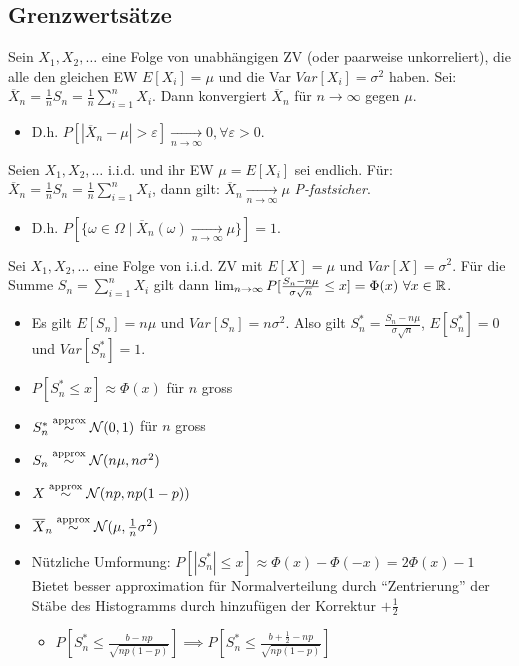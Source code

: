 \subsection{Grenzwertsätze}
\begin{itemize}
     Sein $X_1, X_2, \dots$ eine Folge von unabhängigen ZV (oder paarweise unkorreliert), die alle den gleichen EW $E[X_i] = \mu$ und die Var $Var[X_i] = \sigma^2$ haben. Sei: $\overline{X}_n = \frac{1}{n} S_n = \frac{1}{n} \sum_{i=1}^{n} X_i$. Dann konvergiert $\overline{X}_n$ für $n \to \infty$ gegen $\mu$.
        \begin{itemize}
            \item  D.h. $P[|\overline{X}_n - \mu| > \varepsilon] \underset{n \to \infty}{\to} 0, \forall \varepsilon > 0$.
        \end{itemize}
     Seien $X_1, X_2, \dots$ i.i.d. und ihr EW $\mu = E[X_i]$ sei endlich. Für: $\overline{X}_n = \frac{1}{n} S_n = \frac{1}{n} \sum_{i=1}^{n} X_i$, dann gilt: $\overline{X}_n \underset{n \to \infty}{\to} \mu$ \textit{P-fastsicher}.
        \begin{itemize}
            \item D.h. $P[\{\omega \in \Omega \mid \overline{X}_n(\omega) \underset{n \to \infty}{\to} \mu\}] = 1$.
        \end{itemize}
     Sei $X_1, X_2, \dots$ eine Folge von i.i.d. ZV mit $E[X] = \mu$ und $Var[X] = \sigma^2$. Für die Summe $S_n = \sum_{i=1}^{n} X_i$ gilt dann $\lim_{n \to \infty} P[\frac{S_n - n \mu}{\sigma \sqrt{n}} \le x] = \Phi(x) \ \forall x \in \mathbb{R}$.
        \begin{itemize}
            \item Es gilt $E[S_n] = n\mu$ und $Var[S_n] = n\sigma^2$. Also gilt $S_n^* = \frac{S_n - n\mu}{\sigma \sqrt{n}}$, $E[S_n^*] = 0$ und $Var[S_n^*] = 1$.
            \item $P[S_n^* \le x] \approx \Phi(x)$ für $n$ gross
            \item $S_n^* \overset{\text{approx}}{\sim} \mathcal{N}(0,1)$ für $n$ gross
            \item $S_n \overset{\text{approx}}{\sim} \mathcal{N}(n \mu, n \sigma^2)$
            \item $X \overset{\text{approx}}{\sim} \mathcal{N}(np, np(1-p))$
            \item $\overline{X}_n \overset{\text{approx}}{\sim} \mathcal{N}(\mu, \frac{1}{n} \sigma^2)$
            \item Nützliche Umformung: $P[|S_n^*| \le x] \approx \Phi(x) - \Phi(-x) = 2 \Phi(x) - 1$
             Bietet besser approximation für Normalverteilung durch ``Zentrierung'' der Stäbe des Histogramms durch hinzufügen der Korrektur $+\frac{1}{2}$
                \begin{itemize}
                    \item $P[S_n^* \le \frac{b - np}{\sqrt{np(1 - p)}}] \implies P[S_n^* \le \frac{b + \frac{1}{2} - np}{\sqrt{np(1 - p)}}]$
                \end{itemize}
        \end{itemize}
\end{itemize}
